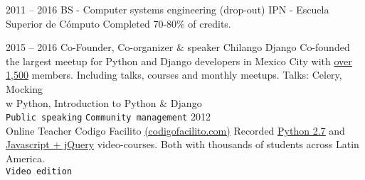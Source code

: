 \documentclass[9pt]{developercv} %
\begin{document}


\begin{entrylist}
    \entry
        {2011 -- 2016}
        {BS - Computer systems engineering (drop-out)}
        {IPN - Escuela Superior de Cómputo}
        {Completed 70-80\% of credits.}
\end{entrylist}


\begin{entrylist}
    \entry
        {2015 -- 2016}
        {Co-Founder, Co-organizer \& speaker}
        {Chilango Django}
        {
            Co-founded the largest meetup for Python and Django developers in Mexico City with
            {\href{https://meetup.com/Chilango-Django/}{\underline{over 1,500}}}
            members. Including talks, courses and monthly meetups. \small{Talks: Celery, Mocking \\w Python, Introduction to Python \& Django} \\
            \texttt{Public speaking}\slashsep
            \texttt{Community management}
        }
    \entry
        {2012\\\footnotesize{Online}}
        {Teacher}
        {Codigo Facilito {\href{(https://codigofacilito.com/}{(codigofacilito.com)}}}
        {
            Recorded 
            {\href{https://www.youtube.com/watch?v=CjmzDHMHxwU&list=PLE549A038CF82905F}{\underline{Python 2.7}}} 
            and {\href{https://www.youtube.com/watch?v=jKbjblt4NXA&list=PLpOqH6AE0tNi47LF-_6gddgq10lp_TLDB}{\underline{Javascript + jQuery}}} 
            video-courses. Both with thousands of students across Latin America.\\
            \texttt{Video edition}
        }
\end{entrylist}
\end{document}
